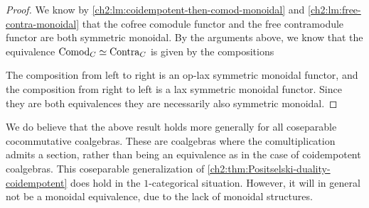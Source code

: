 \begin{proof}

    We know by \cref{ch2:lm:coidempotent-then-comod-monoidal} and \cref{ch2:lm:free-contra-monoidal} that the cofree comodule functor and the free contramodule functor are both symmetric monoidal. By the arguments above, we know that the equivalence $\mathrm{Comod}_C\simeq \mathrm{Contra}_C$ is given by the compositions 
    \begin{center}
    \end{center}
    The composition from left to right is an op-lax symmetric monoidal functor, and the composition from right to left is a lax symmetric monoidal functor. Since they are both equivalences they are necessarily also symmetric monoidal. 
\end{proof}

\begin{remark}
    \label{ch2:rm:holds-generally-for-separable}
    We do believe that the above result holds more generally for all coseparable cocommutative coalgebras. These are coalgebras where the comultiplication admits a section, rather than being an equivalence as in the case of coidempotent coalgebras. This coseparable generalization of \cref{ch2:thm:Positselski-duality-coidempotent} does hold in the $1$-categorical situation. However, it will in general not be a monoidal equivalence, due to the lack of monoidal structures. 
\end{remark}


